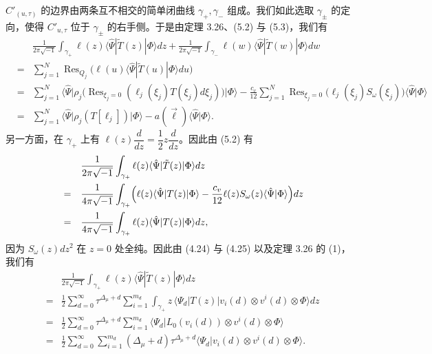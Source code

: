 $C'_{(u,\tau)}$ 的边界由两条互不相交的简单闭曲线 $\gamma_+,\gamma_-$ 组成。我们如此选取 $\gamma_\pm$ 的定向，使得 $C'_{u,\tau}$ 位于 $\gamma_\pm$ 的右手侧。于是由定理 3.26、(5.2) 与 (5.3)，我们有
\[
\begin{array}{rcl}
&&\displaystyle\frac{1}{2\pi\sqrt{-1}}\int_{\gamma_+}\ell(z)\langle\hat\Psi|\tilde T(z)|\Phi\rangle dz
+\frac{1}{2\pi\sqrt{-1}}\int_{\gamma_-}\ell(w)\langle\hat\Psi|\tilde T(w)|\Phi\rangle dw\\[10pt]
&=& \displaystyle\sum_{j=1}^{N}\operatorname{Res}_{Q_j}\bigl(\ell(u)\langle\hat\Psi|\tilde T(u)|\Phi\rangle du\bigr)\\[10pt]
&=& \displaystyle\sum_{j=1}^{N}\bigl\langle\hat\Psi\big|\rho_j\bigl(\operatorname{Res}_{\xi_j=0}
   (\ell_j(\xi_j)T(\xi_j)d\xi_j)\bigr)\big|\Phi\bigr\rangle
-\frac{c_v}{12}\sum_{j=1}^{N}\operatorname{Res}_{\xi_j=0}\bigl(\ell_j(\xi_j)S_\omega(\xi_j)\bigr)
   \langle\hat\Psi|\Phi\rangle\\[10pt]
&=& \displaystyle\sum_{j=1}^{N}\bigl\langle\hat\Psi\big|\rho_j(T[\ell_j])\big|\Phi\bigr\rangle
-a(\vec\ell)\langle\hat\Psi|\Phi\rangle.
\end{array}
\]
另一方面，在 $\gamma_+$ 上有 $\ell(z)\dfrac{d}{dz}=\dfrac12 z\dfrac{d}{dz}$。因此由 (5.2) 有
\[
\begin{array}{rcl}
&&\displaystyle\frac{1}{2\pi\sqrt{-1}}\int_{\gamma_+}\ell(z)\langle\hat\Psi|\tilde T(z)|\Phi\rangle dz\\[12pt]
&=& \displaystyle\frac{1}{4\pi\sqrt{-1}}\int_{\gamma_+}
\Bigl(\ell(z)\langle\hat\Psi|T(z)|\Phi\rangle-\frac{c_v}{12}\ell(z)S_\omega(z)\langle\hat\Psi|\Phi\rangle\Bigr)dz\\[12pt]
&=& \displaystyle\frac{1}{4\pi\sqrt{-1}}\int_{\gamma_+}\ell(z)\langle\hat\Psi|T(z)|\Phi\rangle dz,
\end{array}
\]
因为 $S_\omega(z)dz^2$ 在 $z=0$ 处全纯。因此由 (4.24) 与 (4.25) 以及定理 3.26 的 (1)，我们有
\[
\begin{array}{rcl}
&&\displaystyle\frac{1}{2\pi\sqrt{-1}}\int_{\gamma_+}\ell(z)\langle\hat\Psi|\tilde T(z)|\Phi\rangle dz\\[12pt]
&=& \displaystyle\frac12\sum_{d=0}^{\infty}\tau^{\Delta_\mu+d}\sum_{i=1}^{m_d}
\int_{\gamma_+}z\,\langle\Psi_d|T(z)|v_i(d)\otimes v^i(d)\otimes\Phi\rangle dz\\[12pt]
&=& \displaystyle\frac12\sum_{d=0}^{\infty}\tau^{\Delta_\mu+d}\sum_{i=1}^{m_d}
\langle\Psi_d|L_0(v_i(d))\otimes v^i(d)\otimes\Phi\rangle\\[12pt]
&=& \displaystyle\frac12\sum_{d=0}^{\infty}\sum_{i=1}^{m_d}
(\Delta_\mu+d)\tau^{\Delta_\mu+d}\langle\Psi_d|v_i(d)\otimes v^i(d)\otimes\Phi\rangle.
\end{array}
\]
